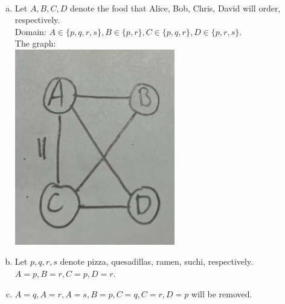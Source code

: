 \begin{pr}$ $
\begin{enumerate}[(a)]
\item Let $A, B, C, D$ denote the food that Alice, Bob, Chris, David will order, respectively.\\
Domain: $A\in\{p, q, r, s\}, B\in\{p, r\}, C\in\{p, q, r\}, D\in\{p, r, s\}$.\\
The graph:\\
\includegraphics[width=7cm]{p4.JPG}
\item Let $p, q, r, s$ denote pizza, quesadillas, ramen, suchi, respectively.\\
$A=p, B=r, C=p, D=r$.
\item $A=q, A=r, A=s, B=p, C=q, C=r, D=p$ will be removed.
\end{enumerate}
\end{pr}
